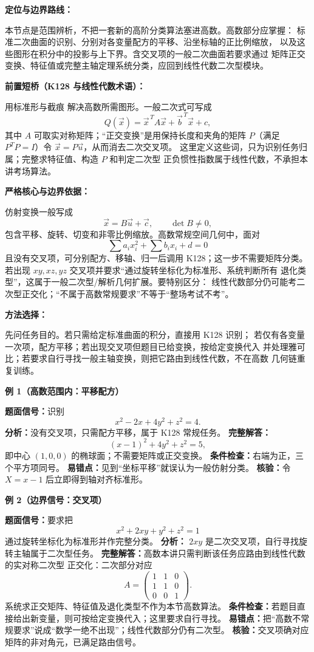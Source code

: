 \begin{knowledgeBox}
\textbf{定位与边界路线：}

本节点是范围辨析，不把一套新的高阶分类算法塞进高数。高数部分应掌握：
标准二次曲面的识别、分别对各变量配方的平移、沿坐标轴的正比例缩放，
以及这些图形在积分中的投影与上下界。含交叉项的一般二次曲面若要求通过
矩阵正交变换、特征值或完整主轴定理系统分类，应回到线性代数二次型模块。

\textbf{前置短桥（K128 与线性代数术语）：}

用标准形与截痕
解决高数所需图形。一般二次式可写成
\[
Q(\vec x)=\vec x^{\,T}A\vec x+\vec b^{\,T}\vec x+c,
\]
其中 \(A\) 可取实对称矩阵；“正交变换”是用保持长度和夹角的矩阵
\(P\)（满足 \(P^TP=I\)）令 \(\vec x=P\vec u\)，从而消去二次交叉项。
这里定义这些词，只为识别任务归属；完整求特征值、构造 \(P\) 和判定二次型
正负惯性指数属于线性代数，不承担本讲考场算法。

\textbf{严格核心与边界依据：}

仿射变换一般写成
\[
\vec x=B\vec u+\vec c,\qquad \det B\ne0,
\]
包含平移、旋转、切变和非零比例缩放。高数常规空间几何中，面对
\[
\sum a_i x_i^2+\sum b_i x_i+d=0
\]
且没有交叉项，可分别配方、移轴、归一后调用 K128；这一步不需要矩阵分类。
若出现 \(xy,xz,yz\) 交叉项并要求“通过旋转坐标化为标准形、系统判断所有
退化类型”，这属于一般二次型/解析几何扩展。要特别区分：
线性代数部分仍可能考二次型正交化；“不属于高数常规要求”不等于“整场考试不考”。

\textbf{方法选择：}

先问任务目的。若只需给定标准曲面的积分，直接用 K128 识别；
若仅有各变量一次项，配方平移；若出现交叉项但题目已给变换，按给定变换代入
并处理雅可比；若要求自行寻找一般主轴变换，则把它路由到线性代数，不在高数
几何链重复训练。

\textbf{例 1（高数范围内：平移配方）}

\textbf{题面信号：}识别
\[
x^2-2x+4y^2+z^2=4.
\]
\textbf{分析：}没有交叉项，只需配方平移，属于 K128 常规任务。
\textbf{完整解答：}
\[
(x-1)^2+4y^2+z^2=5,
\]
即中心 \((1,0,0)\) 的椭球面；不需要矩阵或正交变换。
\textbf{条件检查：}右端为正，三个平方项同号。
\textbf{易错点：}见到“坐标平移”就误认为一般仿射分类。
\textbf{核验：}令 \(X=x-1\) 后立即得到轴对齐标准形。

\textbf{例 2（边界信号：交叉项）}

\textbf{题面信号：}要求把
\[
x^2+2xy+y^2+z^2=1
\]
通过旋转坐标化为标准形并作完整分类。
\textbf{分析：} \(2xy\) 是二次交叉项，自行寻找旋转主轴属于二次型任务。
\textbf{完整解答：}高数本讲只需判断该任务应路由到线性代数的实对称二次型
正交化：二次部分对应
\[
A=\begin{pmatrix}1&1&0\\1&1&0\\0&0&1\end{pmatrix}.
\]
系统求正交矩阵、特征值及退化类型不作为本节高数算法。
\textbf{条件检查：}若题目直接给出新变量，则可按给定变换代入；这里要求自行寻找。
\textbf{易错点：}把“高数不常规要求”说成“数学一绝不出现”；线性代数部分仍有二次型。
\textbf{核验：}交叉项确对应矩阵的非对角元，已满足路由信号。


\end{knowledgeBox}
